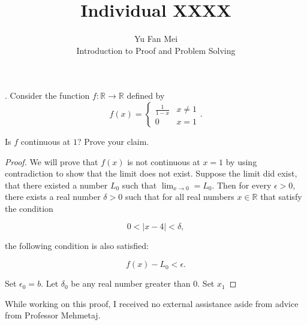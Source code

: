 \documentclass[12pt]{article}
\newenvironment{problem}[2][Problem]{\begin{trivlist}
\item[\hskip \labelsep {\bfseries #1}\hskip \labelsep {\bfseries #2.}]}{\end{trivlist}}
\begin{document}

\title{Individual XXXX}%
\author{Yu Fan Mei\\
	Introduction to Proof and Problem Solving} %

\maketitle

\begin{problem}{1}
    1. Consider the function $f: \mathbb{R} \to \mathbb{R}$ defined by
    \begin{equation*}
        f(x) = \begin{cases}
        \frac{1}{1- x} & x \neq 1 \\
        0 & x = 1
        \end{cases}.
    \end{equation*}
 
Is $f$ continuous at $1$? Prove your claim.
\end{problem}

\begin{proof}
    We will prove that $f(x)$ is not continuous at $x = 1$ by using contradiction to show that the limit does not exist. Suppose the limit did exist, that there existed a number $L_0$ such that $\lim_{x \to 0} = L_0$. Then for every $\epsilon > 0$, there exists a real number $\delta > 0$ such that for all real numbers $x \in \mathbb{R}$ that satisfy the condition

    \[0 < |x - 4| < \delta,\]

    the following condition is also satisfied:

    \[ f(x) - L_0 < \epsilon.\]

    Set $\epsilon_0 = b$. Let $\delta_0$ be any real number greater than 0. Set $x_1 $

\end{proof}


\noindent While working on this proof, I received no external assistance aside from advice from Professor Mehmetaj.
\end{document}
